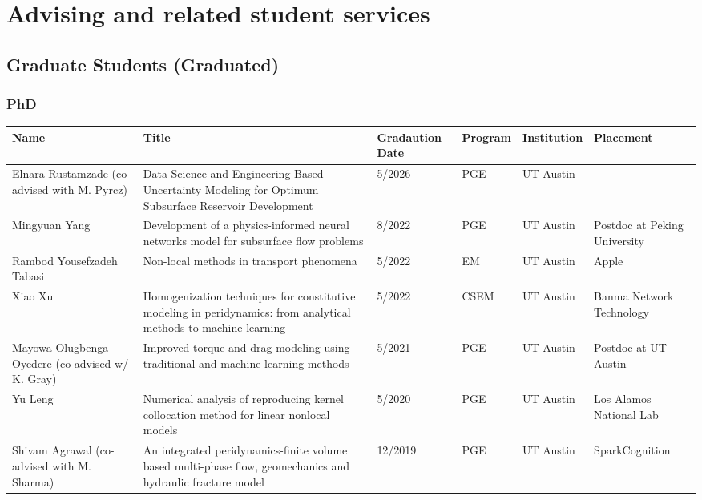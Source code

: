 \section*{Advising and related student services}

\subsection*{Graduate Students (Graduated)}

\subsubsection*{PhD}
\ifdefined\iscockrell
{\footnotesize
  \begin{center}
    \begin{longtable}{p{1.7cm}p{6.5cm}P{1.2cm}P{1.2cm}P{1.2cm}p{2.0cm}}
      \centering\textbf{Name} & \centering\textbf{Title} & \centering\textbf{Gradaution Date} & \centering\textbf{Program}  & \textbf{Institution} & \textbf{Placement} \\
      \midrule
      Elnara Rustamzade \newline (co-advised with M. Pyrcz) & Data Science and Engineering-Based Uncertainty Modeling for Optimum Subsurface Reservoir Development & 5/2026 & PGE & UT Austin &  \\
      Mingyuan Yang & Development of a physics-informed neural networks model for subsurface flow problems & 8/2022 & PGE & UT Austin & Postdoc at Peking University   \\
      Rambod Yousefzadeh Tabasi &  Non-local methods in transport phenomena & 5/2022 & EM & UT Austin & Apple \\
      Xiao Xu &  Homogenization techniques for constitutive modeling in peridynamics: from analytical methods to machine learning & 5/2022 & CSEM & UT Austin & Banma Network Technology \\
      Mayowa Olugbenga Oyedere \newline (co-advised w/ K. Gray) & Improved torque and drag modeling using traditional and machine learning methods & 5/2021 & PGE & UT Austin & Postdoc at UT Austin\\
      Yu Leng & Numerical analysis of reproducing kernel collocation method for linear nonlocal models & 5/2020 & PGE & UT Austin & Los Alamos National Lab \\
      Shivam Agrawal \newline (co-advised with M. Sharma) & An integrated peridynamics-finite volume based multi-phase flow, geomechanics and hydraulic fracture model & 12/2019 & PGE & UT Austin & SparkCognition \\

\end{longtable}
\end{center}}
